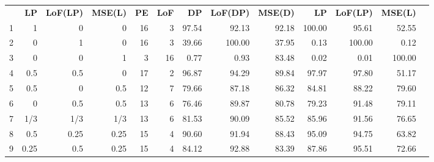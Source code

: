 \begin{table}[h]
{\begin{tabular}{rrrrrrrrrrrrr}
   & \textbf{LP}       & \textbf{LoF(LP)}    & \textbf{MSE(L)}   & \textbf{PE}        & \textbf{LoF}        & \textbf{DP}   & \textbf{LoF(DP)}   & \textbf{MSE(D)}  & \textbf{LP}       & \textbf{LoF(LP)}   & \textbf{MSE(L)}  \\
1 & 1    & 0    & 0    & \multicolumn{1}{|r}{16} & \multicolumn{1}{r|}{3} & 97.54 & 92.13 & 92.18 & \multicolumn{1}{|r}{100.00} & 95.61  & 52.55  \\
2 & 0    & 1    & 0    & \multicolumn{1}{|r}{16} & \multicolumn{1}{r|}{3} & 39.66 & 100.00 & 37.95 & \multicolumn{1}{|r}{0.13}   & 100.00 & 0.12   \\
3 & 0    & 0    & 1    & \multicolumn{1}{|r}{3} & \multicolumn{1}{r|}{16} & 0.77  & 0.93  & 83.48 & \multicolumn{1}{|r}{0.02}   & 0.01   & 100.00 \\
4 & 0.5  & 0.5  & 0    & \multicolumn{1}{|r}{17} & \multicolumn{1}{r|}{2} & 96.87 & 94.29 & 89.84 & \multicolumn{1}{|r}{97.97}  & 97.80  & 51.17  \\
5 & 0.5  & 0    & 0.5  & \multicolumn{1}{|r}{12} & \multicolumn{1}{r|}{7} & 79.66 & 87.18 & 86.32 & \multicolumn{1}{|r}{84.81}  & 88.22  & 79.60  \\
6 & 0    & 0.5  & 0.5  & \multicolumn{1}{|r}{13} & \multicolumn{1}{r|}{6} & 76.46 & 89.87 & 80.78 & \multicolumn{1}{|r}{79.23}  & 91.48  & 79.11  \\
7 & 1/3  & 1/3  & 1/3  & \multicolumn{1}{|r}{13} & \multicolumn{1}{r|}{6} & 81.53 & 90.09 & 85.52 & \multicolumn{1}{|r}{85.96}  & 91.56  & 76.65  \\
8 & 0.5  & 0.25 & 0.25 & \multicolumn{1}{|r}{15} & \multicolumn{1}{r|}{4} & 90.60 & 91.94 & 88.43 & \multicolumn{1}{|r}{95.09}  & 94.75  & 63.82  \\
9 & 0.25 & 0.5  & 0.25 & \multicolumn{1}{|r}{15} & \multicolumn{1}{r|}{4} & 84.12 & 92.88 & 83.39 & \multicolumn{1}{|r}{87.86}  & 95.51  & 72.66 
\end{tabular}
}
\end{table}

%   

